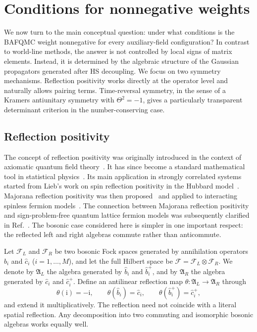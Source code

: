 \documentclass[twocolumn,aps,prb,10pt,amsmath,amssymb,amsthm,superscriptaddress]{revtex4-2}
\newcommand{\ii}{\mathrm{i}}
\newcommand{\mc}[1]{\mathcal{#1}}
\theoremstyle{remark}
\begin{document}
    
\section{Conditions for nonnegative weights}
\label{sec:positive}

We now turn to the main conceptual question: under what conditions is the BAFQMC weight nonnegative for every auxiliary-field configuration? In contrast to world-line methods, the answer is not controlled by local signs of matrix elements. Instead, it is determined by the algebraic structure of the Gaussian propagators generated after HS decoupling. We focus on two symmetry mechanisms. Reflection positivity works directly at the operator level and naturally allows pairing terms. Time-reversal symmetry, in the sense of a Kramers antiunitary symmetry with $\Theta^2=-1$, gives a particularly transparent determinant criterion in the number-conserving case.

\subsection{Reflection positivity}
\label{sec:reflection}

The concept of reflection positivity was originally introduced in the context of axiomatic quantum field theory~\cite{osterwalder1973axioms}. It has since become a standard mathematical tool in statistical physics~\cite{kondratiev2006reflection,biskup2009reflection}. Its main application in strongly correlated systems started from Lieb's work on spin reflection positivity in the Hubbard model~\cite{lieb1989prl}. Majorana reflection positivity was then proposed~\cite{jaffe2015reflection,jaffe2016characterization} and applied to interacting spinless fermion models~\cite{wei2015prb}. The connection between Majorana reflection positivity and sign-problem-free quantum lattice fermion models was subsequently clarified in Ref.~\cite{wei2016prl}. The bosonic case considered here is simpler in one important respect: the reflected left and right algebras commute rather than anticommute.

Let $\mc F_L$ and $\mc F_R$ be two bosonic Fock spaces generated by annihilation operators $\hat b_i$ and $\hat c_i$ ($i=1,\dots,M$), and let the full Hilbert space be $\mc F=\mc F_L\otimes \mc F_R$. We denote by $\mathfrak A_L$ the algebra generated by $\hat b_i$ and $\hat b_i^+$, and by $\mathfrak A_R$ the algebra generated by $\hat c_i$ and $\hat c_i^+$. Define an antilinear reflection map $\theta:\mathfrak A_L\to\mathfrak A_R$ through
\begin{equation}
    \theta(\ii) = -\ii,
    \qquad
    \theta(\hat b_i)=\hat c_i,
    \qquad
    \theta(\hat b_i^+)=\hat c_i^+,
    \label{eq:theta_def}
\end{equation}
and extend it multiplicatively. The reflection need not coincide with a literal spatial reflection. Any decomposition into two commuting and isomorphic bosonic algebras works equally well.
\end{document}
